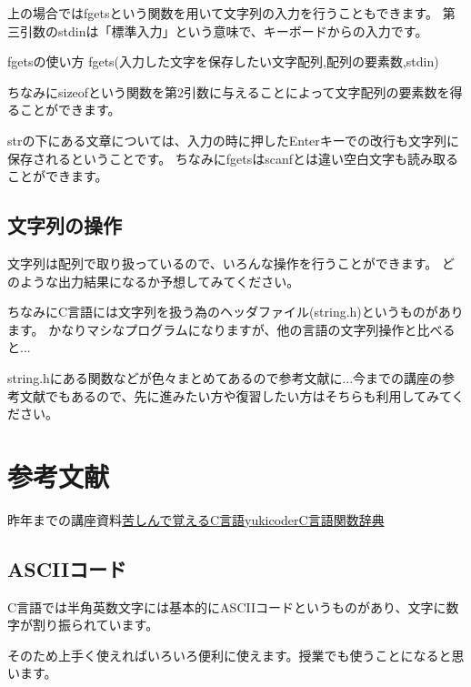 

上の場合ではfgetsという関数を用いて文字列の入力を行うこともできます。
第三引数のstdinは「標準入力」という意味で、キーボードからの入力です。

\begin{itembox}{fgetsの使い方}
fgets(入力した文字を保存したい文字配列,配列の要素数,stdin)
\end{itembox}

ちなみにsizeofという関数を第2引数に与えることによって文字配列の要素数を得ることができます。


strの下にある文章については、入力の時に押したEnterキーでの改行も文字列に保存されるということです。
ちなみにfgetsはscanfとは違い空白文字も読み取ることができます。

\subsection{文字列の操作}
文字列は配列で取り扱っているので、いろんな操作を行うことができます。
どのような出力結果になるか予想してみてください。

ちなみにC言語には文字列を扱う為のヘッダファイル(string.h)というものがあります。
かなりマシなプログラムになりますが、他の言語の文字列操作と比べると...


string.hにある関数などが色々まとめてあるので参考文献に...今までの講座の参考文献でもあるので、先に進みたい方や復習したい方はそちらも利用してみてください。

\section*{参考文献}
\noindent
[1]昨年までの講座資料\newline
[2]\href{http://9cguide.appspot.com}{苦しんで覚えるC言語}\newline
[3]\href{https://yukicoder.me/}{yukicoder}\newline
[4]\href{http://www.c-tipsref.com/reference/string.html}{C言語関数辞典}

\subsection{ASCIIコード}
C言語では半角英数文字には基本的にASCIIコードというものがあり、文字に数字が割り振られています。

そのため上手く使えればいろいろ便利に使えます。授業でも使うことになると思います。



